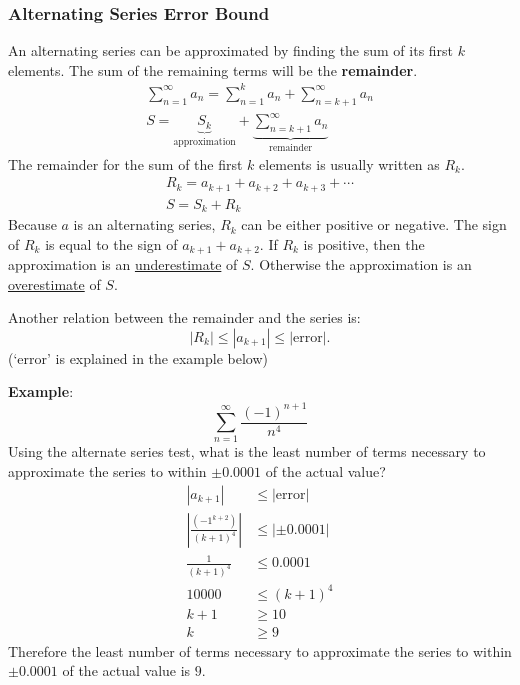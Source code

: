 \documentclass[12pt]{article}
\begin{document}
\subsubsection{Alternating Series Error Bound}
An alternating series can be approximated by finding the sum of its first $k$ elements. The sum of the remaining terms will be the \textbf{remainder}.
\begin{gather*}
    \sum_{n=1}^\infty a_n = \sum_{n=1}^k a_n + \sum_{n=k+1}^\infty a_n \\[10pt]
    S = \underbrace{S_k}_{\text{approximation}} + \underbrace{\sum_{n=k+1}^\infty a_n}_{\text{remainder}}
\end{gather*}
The remainder for the sum of the first $k$ elements is usually written as $R_k$.
\begin{gather*}
    R_k = a_{k+1} + a_{k+2} + a_{k+3} + \cdots \\
    S = S_k + R_k
\end{gather*}
Because $a$ is an alternating series, $R_k$ can be either positive or negative. The sign of $R_k$ is equal to the sign of $a_{k+1} + a_{k+2}$. If $R_k$ is positive, then the approximation is an \underline{underestimate} of $S$. Otherwise the approximation is an \underline{overestimate} of $S$.

\noindent Another relation between the remainder and the series is:
\[ |R_k| \le |a_{k+1}| \le |\text{error}|. \]
(`error' is explained in the example below)

\noindent \textbf{Example}:
\[ \sum_{n=1}^\infty \frac{(-1)^{n+1}}{n^4} \]
Using the alternate series test, what is the least number of terms necessary to approximate the series to within $\pm 0.0001$ of the actual value?
\begin{align*}
    |a_{k+1}|                                 & \le |\text{error}| \\[6pt]
    \left| \frac{(-1^{k+2})}{(k+1)^4} \right| & \le |\pm 0.0001|   \\[6pt]
    \frac{1}{(k+1)^4}                         & \le 0.0001         \\[6pt]
    10000                                     & \le (k+1)^4        \\
    k+1                                       & \ge 10             \\
    k                                         & \ge 9
\end{align*}
Therefore the least number of terms necessary to approximate the series to within $\pm 0.0001$ of the actual value is $9$.
\end{document}
